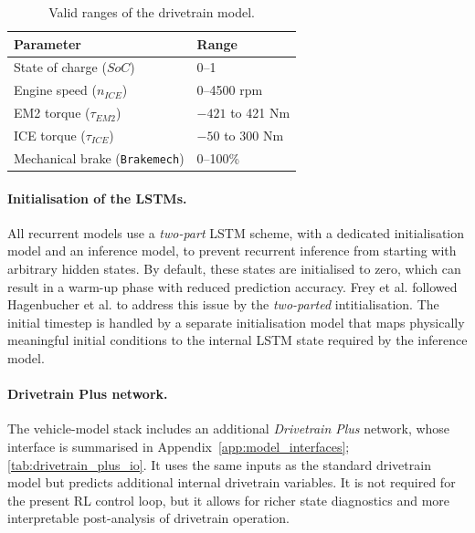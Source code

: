 \begin{table}[H]
  \centering
  \begin{tabular}{|l|l|}
    \hline
    \textbf{Parameter} & \textbf{Range} \\
    \hline
    State of charge ($SoC$) & 0--1 \\
    Engine speed ($n_{ICE}$) & 0--4500 rpm \\
    EM2 torque ($\tau_{EM2}$) & $-421$ to 421 Nm \\
    ICE torque ($\tau_{ICE}$) & $-50$ to 300 Nm \\
    Mechanical brake (\texttt{Brakemech}) & 0--100\% \\
    \hline
  \end{tabular}
  \caption[Drivetrain model valid ranges]{Valid ranges of the drivetrain model.}
  \label{tab:dt_valid_ranges}
\end{table}

\paragraph{Initialisation of the LSTMs.}
All recurrent models use a \emph{two-part} LSTM scheme, with a dedicated initialisation model and an inference model, to prevent recurrent inference from starting with arbitrary hidden states. By default, these states are initialised to zero, which can result in a warm-up phase with reduced prediction accuracy. Frey et al. \cite{frey_data-based_2025} followed Hagenbucher et al. \cite{hagenbucher_initialization_2023} to address this issue by the \emph{two-parted} intitialisation. The initial timestep is handled by a separate initialisation model that maps physically meaningful initial conditions to the internal LSTM state required by the inference model.

\paragraph{Drivetrain Plus network.} The vehicle-model stack includes an additional \emph{Drivetrain Plus} network, whose interface is summarised in Appendix~\ref{app:model_interfaces}; \autoref{tab:drivetrain_plus_io}. It uses the same inputs as the standard drivetrain model but predicts additional internal drivetrain variables. It is not required for the present RL control loop, but it allows for richer state diagnostics and more interpretable post-analysis of drivetrain operation.

